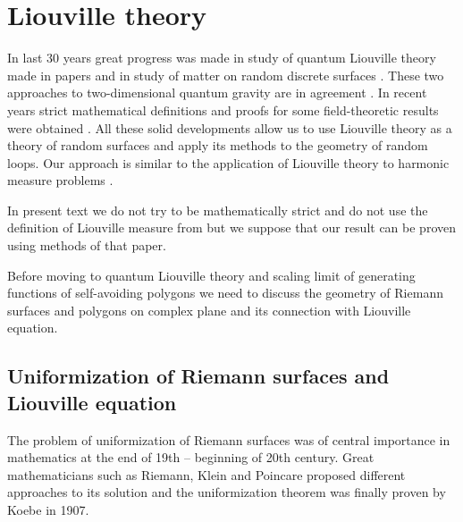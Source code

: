 \documentclass[12pt]{article}
\begin{document}
\section{Liouville theory}
\label{sec:liouville-theory}



In last 30 years great progress was made in study of quantum Liouville theory made in papers
\cite{fateev2000boundary,zamolodchikov1996conformal,knizhnik1988fractal} and in study of matter on
random discrete surfaces
\cite{kazakov1986ising,duplantier1990geometrical,gaudin1989n,duplantier1988conformal}. These two
approaches to two-dimensional quantum gravity are in agreement
\cite{kostov2004boundary,kostov2003boundary}. In recent years strict mathematical definitions and proofs for some
field-theoretic results were obtained \cite{duplantier2011liouville,garban2012quantum}. All these
solid developments allow us to use Liouville theory as a theory of random surfaces and apply its
methods to the geometry of random loops. Our approach is similar to the application of Liouville
theory to harmonic measure problems \cite{duplantier2000conformally}. 

In present text we do not try to be mathematically strict and do not use the definition of Liouville
measure from \cite{duplantier2011liouville} but we suppose that our result can be proven using
methods of that paper.

Before moving to quantum Liouville theory and scaling limit of generating functions of self-avoiding
polygons we need to discuss the geometry of Riemann surfaces and polygons on complex plane and its
connection with Liouville equation. 

\subsection{Uniformization of Riemann surfaces and Liouville equation}
\label{sec:unif-riem-surf}

The problem of uniformization of Riemann surfaces was of central importance in mathematics at the
end of 19th -- beginning of 20th century. Great mathematicians such as Riemann, Klein and Poincare
proposed different approaches to its solution and the uniformization theorem was finally proven by
Koebe in 1907. 
\end{document}
